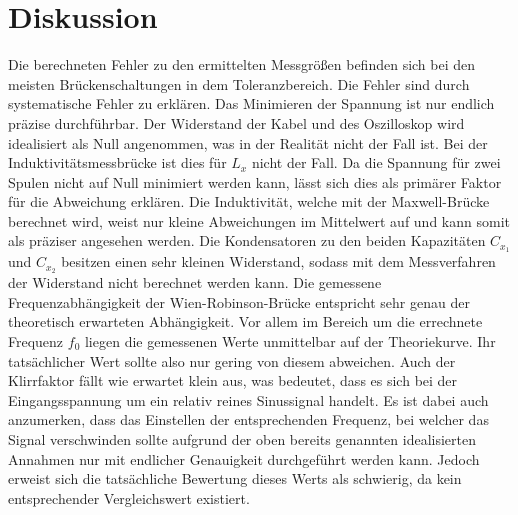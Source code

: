 \section{Diskussion}
\label{sec:Diskussion}
Die berechneten Fehler zu den ermittelten Messgrößen befinden sich bei den meisten
Brückenschaltungen in dem Toleranzbereich. Die Fehler sind durch systematische Fehler zu erklären.
Das Minimieren der Spannung ist nur endlich präzise durchführbar. Der Widerstand der Kabel und des Oszilloskop wird
idealisiert als Null angenommen, was in der Realität nicht der Fall ist.
Bei der Induktivitätsmessbrücke ist dies
für $L_x$ nicht der Fall. Da die Spannung für zwei Spulen nicht auf Null minimiert werden kann, lässt sich dies
als primärer Faktor für die Abweichung erklären. Die Induktivität, welche mit der Maxwell-Brücke berechnet wird, weist
nur kleine Abweichungen im Mittelwert auf und kann somit als präziser angesehen werden. Die Kondensatoren
zu den beiden Kapazitäten $C_{x_1}$ und $C_{x_2}$ besitzen einen sehr kleinen Widerstand, sodass mit dem
Messverfahren der Widerstand nicht berechnet werden kann.
Die gemessene Frequenzabhängigkeit der Wien-Robinson-Brücke entspricht sehr genau der theoretisch erwarteten Abhängigkeit. Vor allem
im Bereich um die errechnete Frequenz $f_0$ liegen die gemessenen Werte unmittelbar auf der Theoriekurve. Ihr tatsächlicher Wert sollte
also nur gering von diesem abweichen.
Auch der Klirrfaktor fällt wie erwartet klein aus, was bedeutet, dass es sich bei der Eingangsspannung um ein relativ reines
Sinussignal handelt. Es ist dabei auch anzumerken, dass das Einstellen der entsprechenden Frequenz, bei welcher das Signal
verschwinden sollte aufgrund der oben bereits genannten idealisierten Annahmen nur mit endlicher Genauigkeit durchgeführt werden kann.
Jedoch erweist sich die tatsächliche Bewertung dieses Werts als schwierig, da kein entsprechender Vergleichswert existiert.
